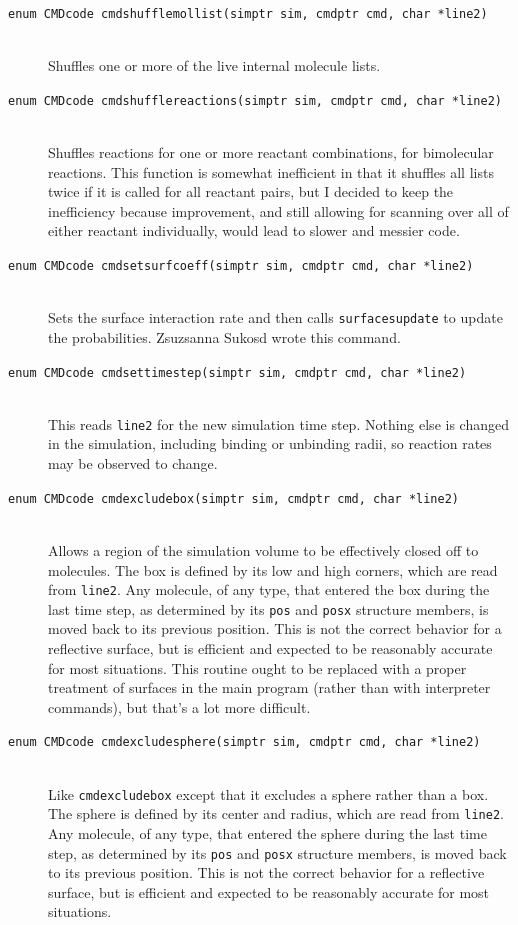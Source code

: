 \documentclass {scrbook}
\newcommand {\ttt} {\texttt}
\begin{document}
\begin{description}
\item[\ttt{enum CMDcode cmdshufflemollist(simptr sim, cmdptr cmd, char *line2)}]
\hfill \\
Shuffles one or more of the live internal molecule lists.

\item[\ttt{enum CMDcode cmdshufflereactions(simptr sim, cmdptr cmd, char *line2)}]
\hfill \\
Shuffles reactions for one or more reactant combinations, for bimolecular reactions. This function is somewhat inefficient in that it shuffles all lists twice if it is called for all reactant pairs, but I decided to keep the inefficiency because improvement, and still allowing for scanning over all of either reactant individually, would lead to slower and messier code.

\item[\ttt{enum CMDcode cmdsetsurfcoeff(simptr sim, cmdptr cmd, char *line2)}]
\hfill \\
Sets the surface interaction rate and then calls \ttt{surfacesupdate} to update the probabilities. Zsuzsanna Sukosd wrote this command.

\item[\ttt{enum CMDcode cmdsettimestep(simptr sim, cmdptr cmd, char *line2)}]
\hfill \\
This reads \ttt{line2} for the new simulation time step. Nothing else is changed in the simulation, including binding or unbinding radii, so reaction rates may be observed to change.

\item[\ttt{enum CMDcode cmdexcludebox(simptr sim, cmdptr cmd, char *line2)}]
\hfill \\
Allows a region of the simulation volume to be effectively closed off to molecules. The box is defined by its low and high corners, which are read from \ttt{line2}. Any molecule, of any type, that entered the box during the last time step, as determined by its \ttt{pos} and \ttt{posx} structure members, is moved back to its previous position. This is not the correct behavior for a reflective surface, but is efficient and expected to be reasonably accurate for most situations. This routine ought to be replaced with a proper treatment of surfaces in the main program (rather than with interpreter commands), but that's a lot more difficult.

\item[\ttt{enum CMDcode cmdexcludesphere(simptr sim, cmdptr cmd, char *line2)}]
\hfill \\
Like \ttt{cmdexcludebox} except that it excludes a sphere rather than a box. The sphere is defined by its center and radius, which are read from \ttt{line2}. Any molecule, of any type, that entered the sphere during the last time step, as determined by its \ttt{pos} and \ttt{posx} structure members, is moved back to its previous position. This is not the correct behavior for a reflective surface, but is efficient and expected to be reasonably accurate for most situations.


\end{description}
\end{document}
